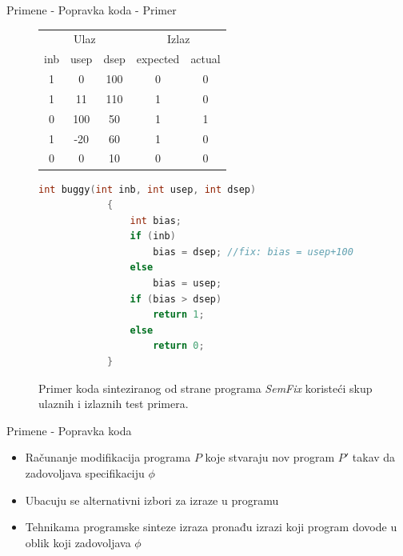 \begin{frame}[fragile]{Primene - Popravka koda - Primer}
    \begin{figure}[!h]
        \centering
        \tiny
        \begin{tabular}{ccc|cc}
            \multicolumn{3}{c|}{Ulaz} & \multicolumn{2}{c}{Izlaz}\\
            inb & usep & dsep & expected & actual \\
            \hline
            1 & 0 & 100 & 0 & 0 \\
            1 & 11 & 110 & 1 & 0 \\
            0 & 100 & 50 & 1 & 1 \\
            1 & -20 & 60 & 1 & 0 \\
            0 & 0 & 10 & 0 & 0 \\
        \end{tabular}

        \centering
        \begin{lstlisting}[language=C, basicstyle=\tiny]
            int buggy(int inb, int usep, int dsep)
            {
                int bias;
                if (inb)
                    bias = dsep; //fix: bias = usep+100
                else
                    bias = usep;
                if (bias > dsep)
                    return 1;
                else
                    return 0;
            }
        \end{lstlisting}

        \caption{Primer koda sinteziranog od strane programa \emph{SemFix} koristeći skup ulaznih i izlaznih test primera.}
        \label{fig:CodeRepair}
    \end{figure}
\end{frame}





\iffalse
\begin{frame}{Primene - Popravka koda}
    \begin{itemize}
        \item Računanje modifikacija programa $P$ koje stvaraju nov program $P'$ takav da zadovoljava specifikaciju $\phi$
        \item Ubacuju se alternativni izbori za izraze u programu
        \item Tehnikama programske sinteze izraza pronađu izrazi koji program dovode u oblik koji zadovoljava $\phi$
    \end{itemize}
\end{frame}

